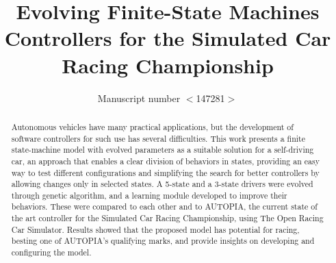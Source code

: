 \documentclass[a4paper]{sbgames}
\title{Evolving Finite-State Machines Controllers for the Simulated Car Racing Championship}
\author{Manuscript number $<$147281$>$}
\begin{document}
	\maketitle

	\begin{abstract}
		Autonomous vehicles have many practical applications, but the development of software controllers for such use has several difficulties. This work presents a finite state-machine model with evolved parameters as a suitable solution for a self-driving car, an approach that enables a clear division of behaviors in states, providing an easy way to test different configurations and simplifying the search for better controllers by allowing changes only in selected states. A 5-state and a 3-state drivers were evolved through genetic algorithm, and a learning module developed to improve their behaviors. These were compared to each other and to AUTOPIA, the current state of the art controller for the Simulated Car Racing Championship, using The Open Racing Car Simulator. Results showed that the proposed model has potential for racing, besting one of AUTOPIA's qualifying marks, and provide insights on developing and configuring the model.
	\end{abstract}

	\keywordlist
	\contactlist

	\FloatBarrier%


	
	
\end{document}

